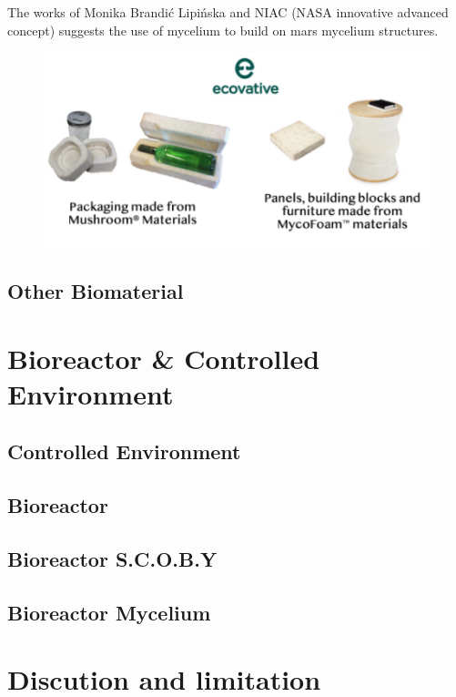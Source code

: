 The works of Monika Brandić Lipińska and NIAC (NASA innovative advanced concept) suggests the use of mycelium\cite{rothschild2019myco} to build on mars mycelium structures\cite{brandic2022biological}.

\begin{figure}[h]
    \centering
    \includegraphics{images/ecovative.png}
    \caption{}
    \label{fig:ecovative}
\end{figure}






\subsection{Other Biomaterial}




















\section{Bioreactor \& Controlled Environment }

\subsection{Controlled Environment} 



















\subsection{Bioreactor}
\subsection{Bioreactor S.C.O.B.Y}
\subsection{Bioreactor Mycelium}



\section{Discution and limitation}